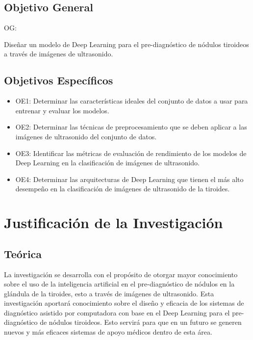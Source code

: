 \subsection{Objetivo General}
OG: \newcommand{\ObjetivoGeneral}{
Diseñar un modelo de Deep Learning para el pre-diagnóstico de nódulos tiroideos a través de imágenes de ultrasonido.
}
\ObjetivoGeneral
\subsection{Objetivos Específicos}
\newcommand{\Objone}{
Determinar las características ideales del conjunto de datos a usar para entrenar y evaluar los modelos.
}
\newcommand{\Objtwo}{
Determinar las técnicas de preprocesamiento que se deben aplicar a las imágenes de ultrasonido del conjunto de datos.
}
\newcommand{\Objthree}{
Identificar las métricas de evaluación de rendimiento de los modelos de Deep Learning en la clasificación de imágenes de ultrasonido.
}
\newcommand{\Objfour}{
Determinar las arquitecturas de Deep Learning que tienen el más alto desempeño en la clasificación de imágenes de ultrasonido de la tiroides.
}

\begin{itemize}
	\item OE1: {\Objone}
	\item OE2: {\Objtwo}
	\item OE3: {\Objthree}
	\item OE4: {\Objfour}
\end{itemize}



\section{Justificación de la Investigación}

\subsection{Teórica}
La investigación se desarrolla con el propósito de otorgar mayor conocimiento sobre el uso de la inteligencia artificial en el pre-diagnóstico de nódulos en la glándula de la tiroides, esto a través de imágenes de ultrasonido. Esta investigación aportará conocimiento sobre el diseño y eficacia de los sistemas de diagnóstico asistido por computadora con base en el Deep Learning para el pre-diagnóstico de nódulos tiroideos. Esto servirá para que en un futuro se generen nuevos y más eficaces sistemas de apoyo médicos dentro de esta área.

